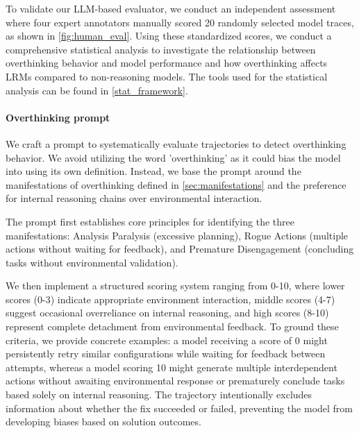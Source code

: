 To validate our LLM-based evaluator, we conduct an independent assessment where four expert annotators manually scored 20 randomly selected model traces, as shown in \cref{fig:human_eval}.
Using these standardized scores, we conduct a comprehensive statistical analysis to investigate the relationship between overthinking behavior and model performance and how overthinking affects LRMs compared to non-reasoning models. The tools used for the statistical analysis can be found in \cref{stat_framework}.

\paragraph{Overthinking prompt} We craft a prompt to systematically evaluate trajectories to detect overthinking behavior. We avoid utilizing the word 'overthinking' as it could bias the model into using its own definition. Instead, we base the prompt around the manifestations of overthinking defined in \cref{sec:manifestations} and the preference for internal reasoning chains over environmental interaction. 

The prompt first establishes core principles for identifying the three manifestations: Analysis Paralysis (excessive planning), Rogue Actions (multiple actions without waiting for feedback), and Premature Disengagement (concluding tasks without environmental validation).

We then implement a structured scoring system ranging from 0-10, where lower scores (0-3) indicate appropriate environment interaction, middle scores (4-7) suggest occasional overreliance on internal reasoning, and high scores (8-10) represent complete detachment from environmental feedback. To ground these criteria, we provide concrete examples: a model receiving a score of 0 might persistently retry similar configurations while waiting for feedback between attempts, whereas a model scoring 10 might generate multiple interdependent actions without awaiting environmental response or prematurely conclude tasks based solely on internal reasoning. The trajectory intentionally excludes information about whether the fix succeeded or failed, preventing the model from developing biases based on solution outcomes.